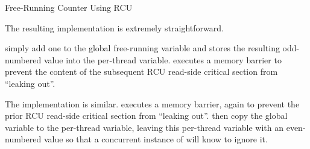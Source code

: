 \begin{listing}[tbp]
\vspace*{-11pt}
\caption{Free-Running Counter Using RCU}
\label{lst:app:toyrcu:Free-Running Counter Using RCU}
\end{listing}

The resulting  implementation is extremely
straightforward.
\begin{fcvref}
 simply
add one to the global free-running 
variable and stores the resulting odd-numbered value into the
 per-thread variable.
 executes a memory barrier to prevent the content of the
subsequent RCU read-side critical section from ``leaking out''.
\end{fcvref}

\begin{fcvref}
The  implementation is similar.
 executes a memory barrier, again to prevent the prior RCU
read-side critical section from ``leaking out''.
 then copy the  global variable to the
 per-thread variable, leaving this per-thread
variable with an even-numbered value so that a concurrent instance
of  will know to ignore it.
\end{fcvref}

\QuickQuizEnd

